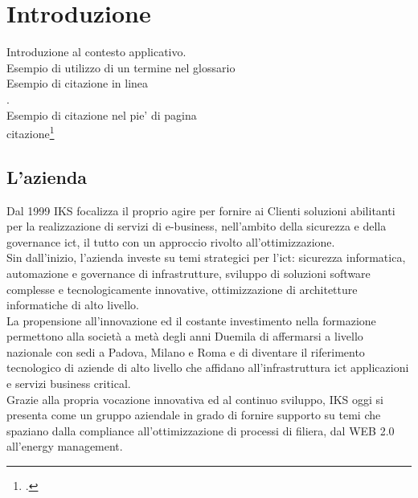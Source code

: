 
\chapter{Introduzione}
\label{cap:introduzione}

Introduzione al contesto applicativo.\\

\noindent Esempio di utilizzo di un termine nel glossario \\

\noindent Esempio di citazione in linea \\
\cite{site:agile-manifesto}. \\

\noindent Esempio di citazione nel pie' di pagina \\
citazione\footcite{womak:lean-thinking} \\

\section{L'azienda}

Dal 1999 IKS focalizza il proprio agire per fornire ai Clienti soluzioni abilitanti per la realizzazione di servizi di e-business, nell’ambito della sicurezza e della \gls{governance} \gls{ict}, il tutto con un approccio rivolto all’ottimizzazione.\\
Sin dall’inizio, l’azienda investe su temi strategici per l’\gls{ict}: sicurezza informatica, automazione e governance di infrastrutture, sviluppo di soluzioni software complesse e tecnologicamente innovative, ottimizzazione di architetture informatiche di alto livello.\\
La propensione all’innovazione ed il costante investimento nella formazione permettono alla società a metà degli anni Duemila di affermarsi a livello nazionale con sedi a Padova, Milano e Roma e di diventare il riferimento tecnologico di aziende di alto livello che affidano all’infrastruttura \gls{ict} applicazioni e servizi business critical.\\
Grazie alla propria vocazione innovativa ed al continuo sviluppo, IKS oggi si presenta come un gruppo aziendale in grado di fornire supporto su temi che spaziano dalla \gls{compliance} all’ottimizzazione di processi di filiera, dal WEB 2.0 all’energy management.

